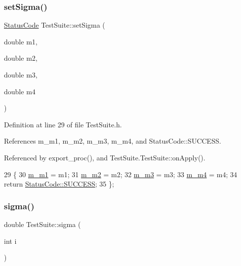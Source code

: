 \subsubsection{\texorpdfstring{set\+Sigma()}{setSigma()}}
{\footnotesize\ttfamily \hyperlink{classStatusCode}{Status\+Code} Test\+Suite\+::set\+Sigma (\begin{DoxyParamCaption}\item[{double}]{m1,  }\item[{double}]{m2,  }\item[{double}]{m3,  }\item[{double}]{m4 }\end{DoxyParamCaption})\hspace{0.3cm}{\ttfamily [inline]}}



Definition at line 29 of file Test\+Suite.\+h.



References m\+\_\+m1, m\+\_\+m2, m\+\_\+m3, m\+\_\+m4, and Status\+Code\+::\+S\+U\+C\+C\+E\+SS.



Referenced by export\+\_\+proc(), and Test\+Suite.\+Test\+Suite\+::on\+Apply().


\begin{DoxyCode}
29                                                                   \{
30     \hyperlink{classTestSuite_a853a92fd3e82371d19993739c2bf1236}{m\_m1} = m1;
31     \hyperlink{classTestSuite_a710aa6029d3d0b47b61a828a472f7546}{m\_m2} = m2;
32     \hyperlink{classTestSuite_acbc062956d67a5f47dfb74286a390300}{m\_m3} = m3;
33     \hyperlink{classTestSuite_ac3d39b72dd5fce4c48eb39ea56be3e36}{m\_m4} = m4;
34     \textcolor{keywordflow}{return} \hyperlink{classStatusCode_a6f565cbeadc76d14c72f047e5e85eb4badd0da38d3ba0d922efd1f4619bc37ad8}{StatusCode::SUCCESS};
35   \};
\end{DoxyCode}
\mbox{\label{classTestSuite_a9c74de1a21bc0998253da5e9befe6a42}} 
\subsubsection{\texorpdfstring{sigma()}{sigma()}}
{\footnotesize\ttfamily double Test\+Suite\+::sigma (\begin{DoxyParamCaption}\item[{int}]{i }\end{DoxyParamCaption})\hspace{0.3cm}{\ttfamily [inline]}}



